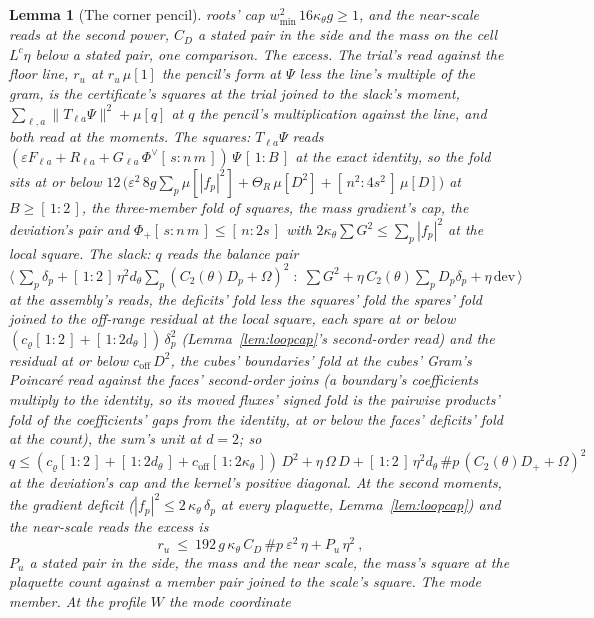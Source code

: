 \documentclass[11pt]{article}
\newtheorem{lemma}{Lemma}
\theoremstyle{definition}
\begin{document}
\begin{lemma}[The corner pencil]
roots' cap $w_{\min}^{2}\,16\kappa_\theta g\ge1$, and the near-scale
reads at the second power, $C_D$ a stated pair in the side and the
mass on the cell $L^{c}\eta$ below a stated pair, one comparison.
\emph{The excess.} The trial's read against the floor line,
$r_u$ at $r_u\,\mu[1]$ the pencil's form at $\Psi$ less the line's
multiple of the gram, is the certificate's squares at the trial
joined to the slack's moment, $\sum_{\ell,a}\|T_{\ell a}\Psi\|^{2}+\mu[q]$
at $q$ the pencil's multiplication against the line, and both read
at the moments. The squares: $T_{\ell a}\Psi$ reads
$(\varepsilon F_{\ell a}+R_{\ell a}+G_{\ell a}\,\Phi^{\vee}[\,s:n\,m\,])\,\Psi\,[\,1:B\,]$
at the exact identity, so the fold sits at or below
$12\,\big(\varepsilon^{2}\,8g\sum_p\mu[|f_p|^{2}]+\Theta_R\,\mu[D^{2}]
+[\,n^{2}:4s^{2}\,]\,\mu[D]\big)$ at $B\ge[\,1:2\,]$, the three-member
fold of squares, the mass gradient's cap, the deviation's pair and
$\Phi_+[\,s:n\,m\,]\le[\,n:2s\,]$ with $2\kappa_\theta\sum G^{2}\le\sum_p|f_p|^{2}$
at the local square. The slack: $q$ reads the balance pair
$\big\langle\,\sum_p\delta_p+[\,1:2\,]\,\eta^{2}d_\theta\sum_p(C_2(\theta)D_p+\Omega)^{2}
\;:\;\sum G^{2}+\eta\,C_2(\theta)\sum_pD_p\delta_p+\eta\,\mathrm{dev}\,\big\rangle$
at the assembly's reads, the deficits' fold less the squares' fold the
spares' fold joined to the off-range residual at the local square,
each spare at or below $(c_\varrho[\,1:2\,]+[\,1:2d_\theta\,])\,\delta_p^{2}$
(Lemma~\ref{lem:loopcap}'s second-order read) and the residual at
or below $c_{\mathrm{off}}\,D^{2}$, the cubes' boundaries' fold at
the cubes' Gram's Poincar\'e read against the faces' second-order
joins (a boundary's coefficients multiply to the identity, so its
moved fluxes' signed fold is the pairwise products' fold of the
coefficients' gaps from the identity, at or below the faces'
deficits' fold at the count), the sum's unit at $d=2$; so
$q\le(c_\varrho[\,1:2\,]+[\,1:2d_\theta\,]+c_{\mathrm{off}}[\,1:2\kappa_\theta\,])\,D^{2}
+\eta\,\Omega\,D+[\,1:2\,]\,\eta^{2}d_\theta\,\#p\,(C_2(\theta)D_++\Omega)^{2}$
at the deviation's cap and the kernel's positive diagonal. At the
second moments, the gradient deficit ($|f_p|^{2}\le2\,\kappa_\theta\,\delta_p$
at every plaquette, Lemma~\ref{lem:loopcap}) and the near-scale
reads the excess is
\[
r_u\ \le\ 192\,g\,\kappa_\theta\,C_D\,\#p\ \varepsilon^{2}\,\eta+P_u\,\eta^{2}\ ,
\]
$P_u$ a stated pair in the side, the mass and the near scale, the
mass's square at the plaquette count against a member pair joined to the
scale's square.
\emph{The mode member.} At the profile $W$ the mode coordinate

\end{lemma}
\end{document}
